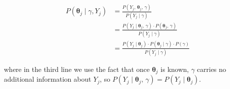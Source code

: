 \begin{align*}
P(\boldsymbol{\theta}_j \mid \gamma, Y_j) &= \frac{P(Y_j,\, \boldsymbol{\theta}_j,\, \gamma)}{P(Y_j \mid \gamma)} \\[10pt]
                                           &= \frac{P(Y_j \mid \boldsymbol{\theta}_j,\, \gamma) \cdot P(\boldsymbol{\theta}_j,\, \gamma)}{P(Y_j \mid \gamma)} \\[10pt]
                                           &= \frac{P(Y_j \mid \boldsymbol{\theta}_j) \cdot P(\boldsymbol{\theta}_j \mid \gamma) \cdot P(\gamma)}{P(Y_j \mid \gamma)}
\end{align*}

where in the third line we use the fact that once $\boldsymbol{\theta}_j$ is known, $\gamma$ carries no additional information about $Y_j$, so $P(Y_j \mid \boldsymbol{\theta}_j,\, \gamma) = P(Y_j \mid \boldsymbol{\theta}_j)$. 